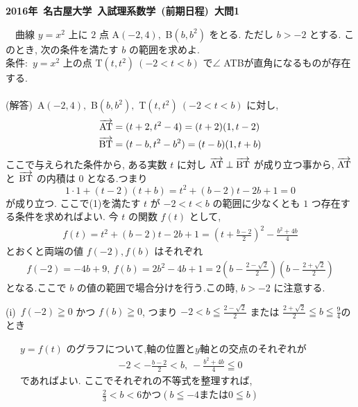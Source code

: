 \documentclass[../main]{subfiles}
\begin{document}
\begin{center}
\bf{\Large 2016年~名古屋大学~入試理系数学~(前期日程)~大問1}
\end{center}
　曲線 $y=x^2$ 上に $2$ 点 A$(-2, 4),$ B$(b, b^2)$ をとる.
ただし $b > -2$ とする.
このとき, 次の条件を満たす $b$ の範囲を求めよ.\\
条件:~$y=x^2$ 上の点 T$(t, t^2)~(-2<t<b)$ で$\angle$ ATBが直角になるものが存在する.\\
\hrulefill
\\
(解答)~A$(-2, 4),$ B$(b, b^2),$ T$(t, t^2)~(-2<t<b)$ に対し,
  \begin{align*}
    \overrightarrow{\rm{AT}} &= (t+2, t^2-4) = (t+2)(1, t-2)\\
    \overrightarrow{\rm{BT}} &= (t-b, t^2-b^2) = (t-b)(1, t+b)
  \end{align*}
  ここで与えられた条件から,
  ある実数 $t$ に対し $\overrightarrow{\rm{AT}} \perp \overrightarrow{\rm{BT}}$ が成り立つ事から,
  $\overrightarrow{\rm{AT}}$ と $\overrightarrow{\rm{BT}}$ の内積は $0$ となる.つまり
  \begin{equation}
    1 \cdot 1 + (t-2)(t+b) = t^2 + (b-2)t -2b+1 = 0
  \end{equation}
  が成り立つ.
  ここで(1)を満たす $t$ が $-2<t<b$ の範囲に少なくとも $1$ つ存在する条件を求めればよい.
  今 $t$ の関数 $f(t)$ として,
  \begin{align*}
   f(t) = t^2 + (b-2)t -2b+1 =\left( t + \frac{b-2}{2} \right)^2 - \frac{b^2+4b}{4}
  \end{align*}
  とおくと両端の値 $f(-2),f(b)$ はそれぞれ
   \begin{align*}
    f(-2) = -4b + 9,~
    f(b) = 2b^2 -4b +1 = 2 \left( b - \frac{2-\sqrt{2}}{2} \right)\left( b - \frac{2+\sqrt{2}}{2} \right)
  \end{align*}
  となる.ここで $b$ の値の範囲で場合分けを行う.この時, $b>-2$ に注意する.
  \begin{flushleft}
    (i)~$f(-2) \geqq 0$ かつ $f(b) \geqq 0$,
    つまり $-2 < b \leqq \frac{2-\sqrt{2}}{2}$
    または $\frac{2+\sqrt{2}}{2} \leqq b \leqq \frac{9}{4}$のとき
  \end{flushleft}
  　~$y=f(t)$ のグラフについて,軸の位置と$y$軸との交点のそれぞれが 
  \begin{align*}
    -2 < - \frac{b-2}{2} < b,~
    - \frac{b^2+4b}{4} \leqq 0
  \end{align*}
  　~であればよい.
  ここでそれぞれの不等式を整理すれば,
  \begin{align*}
    \frac{2}{3} < b < 6 かつ( b \leqq -4 または 0 \leqq b)
  \end{align*}
\end{document}
